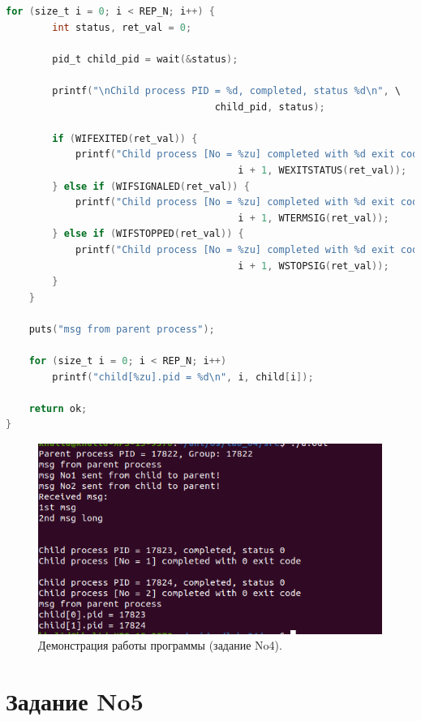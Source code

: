 \documentclass[12pt]{report}
\begin{document}
\begin{lstlisting}[label=some-code,caption=Использование pipe,language=C]
    for (size_t i = 0; i < REP_N; i++) {
        int status, ret_val = 0;

        pid_t child_pid = wait(&status);

        printf("\nChild process PID = %d, completed, status %d\n", \
                                    child_pid, status);
        
        if (WIFEXITED(ret_val)) {
            printf("Child process [No = %zu] completed with %d exit code\n", 
                                        i + 1, WEXITSTATUS(ret_val));
        } else if (WIFSIGNALED(ret_val)) {
            printf("Child process [No = %zu] completed with %d exit code\n", 
                                        i + 1, WTERMSIG(ret_val));
        } else if (WIFSTOPPED(ret_val)) {
            printf("Child process [No = %zu] completed with %d exit code\n", 
                                        i + 1, WSTOPSIG(ret_val));
        }
    }

    puts("msg from parent process");
    
    for (size_t i = 0; i < REP_N; i++)
        printf("child[%zu].pid = %d\n", i, child[i]);
    
    return ok;
}
\end{lstlisting}

\begin{figure}[H]

	\centering

	\includegraphics[width=\linewidth]{img/task04.png}
	\caption{Демонстрация работы программы (задание No4).}

	\label{fig:task04}

\end{figure}

\section*{Задание No5}
\end{document}
